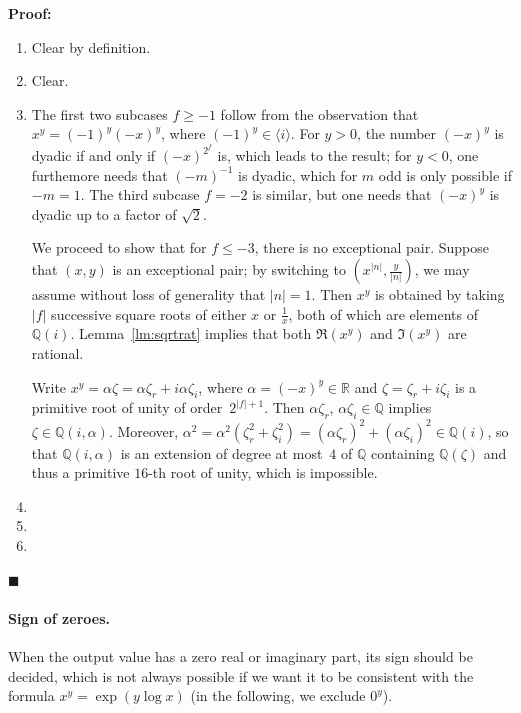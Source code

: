 \documentclass [11pt]{article}
\newcommand {\Q}{\mathbb Q}
\newcommand {\R}{\mathbb R}
\renewcommand {\leq}{\leqslant}
\renewcommand {\geq}{\geqslant}
\newenvironment{proof}{\noindent \textbf {Proof:}}{{\hspace* {\fill}$\blacksquare$}}
\begin{document}
\begin {proof}
\begin {enumerate}
\item
Clear by definition.
\item
Clear.
\item
The first two subcases $f \geq -1$ follow from the observation that
$x^y = (-1)^y (-x)^y$, where $(-1)^y \in \langle i \rangle$.
For $y > 0$, the number $(-x)^y$ is dyadic if and only if $(-x)^{2^f}$ is,
which leads to the result; for $y < 0$, one furthemore needs that
$(-m)^{-1}$ is dyadic, which for $m$ odd is only possible if $-m = 1$.
The third subcase $f = -2$ is similar, but one needs that $(-x)^y$ is dyadic
up to a factor of $\sqrt 2$.

We proceed to show that for $f \leq -3$, there is no exceptional pair.
Suppose that $(x, y)$ is an exceptional pair; by switching to
$\left( x^{|n|}, \frac {y}{|n|} \right)$, we may assume
without loss of generality that $|n| = 1$. Then $x^y$ is obtained by
taking $|f|$ successive square roots of either $x$ or $\frac {1}{x}$, both
of which are elements of $\Q (i)$. Lemma~\ref {lm:sqrtrat} implies
that both $\Re (x^y)$ and $\Im (x^y)$ are rational.

Write $x^y = \alpha \zeta = \alpha \zeta_r + i \alpha \zeta_i$, where
$\alpha = (-x)^y \in \R$ and $\zeta = \zeta_r + i \zeta_i$ is a primitive root
of unity of order~$2^{|f| + 1}$.
Then $\alpha \zeta_r$, $\alpha \zeta_i \in \Q$ implies $\zeta \in \Q (i, \alpha)$.
Moreover,
$\alpha^2 = \alpha^2 (\zeta_r^2 + \zeta_i^2) =
(\alpha \zeta_r)^2 + (\alpha \zeta_i)^2 \in \Q (i)$, so that $\Q (i, \alpha)$
is an extension of degree at most~$4$ of $\Q$ containing $\Q (\zeta)$
and thus a primitive $16$-th root of unity, which is impossible.
\item
\item
\item
\end {enumerate}
\end {proof}

\paragraph{Sign of zeroes.}
When the output value has a zero real or imaginary part, its sign should be
decided, which is not always possible if we want it to be consistent with the
formula $x^y = \exp(y\log x)$ (in the following, we exclude $0^y$).
\end{document}
